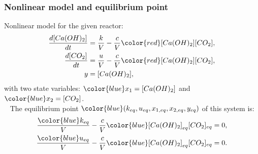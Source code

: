 \begin{frame}
	\frametitle{Nonlinear model and equilibrium point}
	{\color{red}Nonlinear} model for the given reactor:
	\pause
	\begin{align*}
	\frac{d[Ca(OH)_2]}{dt} &= \frac{k}{V} - \frac{c}{V}{\color{red}[Ca(OH)_2][CO_2]}, \\
	\frac{d[CO_2]}{dt} &= \frac{u}{V} - \frac{c}{V}{\color{red}[Ca(OH)_2][CO_2]}, \\
	y &= [Ca(OH)_2],
	\end{align*}
	with two state variables: ${\color{blue}x_1=[Ca(OH)_2]}$ and ${\color{blue}x_2=[CO_2]}$.\\
	\ \newline
	\pause
	The equilibrium point ${\color{blue}(k_{eq}, u_{eq}, x_{1,eq}, x_{2,eq}, y_{eq})}$ of this system is:
	\pause
	\begin{align*}
	\frac{{\color{blue}k_{eq}}}{V} - \frac{c}{V}{\color{blue}[Ca(OH)_2]_{eq}[CO_2]_{eq}} = 0, \\
	\frac{{\color{blue}u_{eq}}}{V} - \frac{c}{V}{\color{blue}[Ca(OH)_2]_{eq}[CO_2]_{eq}} = 0. \\
	\end{align*}
\end{frame}


